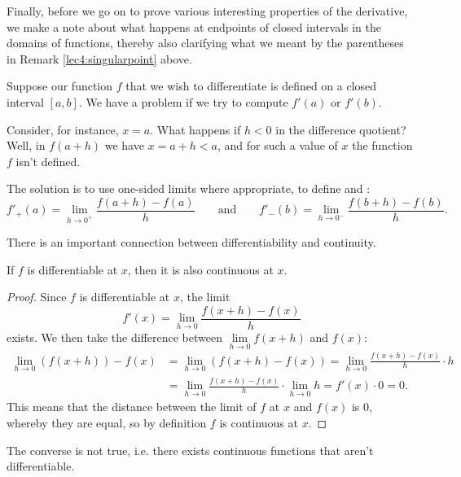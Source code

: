 Finally, before we go on to prove various interesting properties of the derivative, we make a note about what happens at endpoints of closed intervals in the domains of functions, thereby also clarifying what we meant by the parentheses in Remark \ref{lec4:singularpoint} above.

\begin{remark}
	Suppose our function $f$ that we wish to differentiate is defined on a closed interval $[a, b]$. We have a problem if we try to compute $f'(a)$ or $f'(b)$.

	Consider, for instance, $x = a$. What happens if $h < 0$ in the difference quotient? Well, in $f(a + h)$ we have $x = a + h < a$, and for such a value of $x$ the function $f$ isn't defined.

	The solution is to use one-sided limits where appropriate, to define  and :
	\[
		f'_+(a) = \lim_{h \to 0^+} \frac{f(a + h) - f(a)}{h} \qquad \text{and} \qquad f'_- (b) = \lim_{h \to 0^-} \frac{f(b + h) - f(b)}{h}.
	\]
\end{remark}

\noindent
There is an important connection between differentiability and continuity.

\begin{theorem}\label{lec4:diffimpliescont}
	If $f$ is differentiable at $x$, then it is also continuous at $x$.
\end{theorem}

\begin{proof}
	Since $f$ is differentiable at $x$, the limit
	\[
		f'(x) = \lim_{h \to 0} \frac{f(x + h) - f(x)}{h}
	\]
	exists. We then take the difference between $\lim\limits_{h \to 0} f(x + h)$ and $f(x)$:
	\begin{align*}
		\lim\limits_{h \to 0} (f(x + h)) - f(x) & = \lim_{h \to 0} (f(x + h) - f(x)) = \lim_{h \to 0} \frac{f(x + h) - f(x)}{h} \cdot h  \\
		                                        & = \lim_{h \to 0} \frac{f(x + h) - f(x)}{h} \cdot \lim_{h \to 0} h = f'(x) \cdot 0 = 0.
	\end{align*}
	This means that the distance between the limit of $f$ at $x$ and $f(x)$ is 0, whereby they are equal, so by definition $f$ is continuous at $x$.
\end{proof}

\noindent
The converse is not true, i.e. there exists continuous functions that aren't differentiable.

